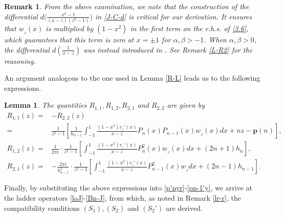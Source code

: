 \documentclass[12pt,a4paper]{article}    %
\newtheorem{lemma}[theorem]{Lemma}
\newtheorem{remark}{Remark}
\numberwithin{equation}{section}
\begin{document}
{\sloppy \begin{remark}
From the above examination, we note that the construction of  the differential $d\big(\frac{x^2-1}{(x-z)(z^2-1)}\big)$  in  \eqref{J-C-d} is critical for our derivation. It ensures that $w_{_{J}}(x)$ is multiplied by $(1-x^2)$ in the first term on the r.h.s. of \eqref{3.6}, which guarantees that this term is zero at $x=\pm1$ for $\alpha,\beta>-1$.
When $\alpha,\beta>0$, the differential $d\left(\frac{1}{x-z}\right)$ was instead introduced in \cite{WvA18}. See Remark \ref{L-R2} for the reasoning.
\end{remark}}

An argument analogous to the one used in Lemma \ref{R-L} leads us to the following expressions.

\begin{lemma}
		The quantities $R_{1,1}, R_{1,2}, R_{2,1}$ and  $R_{2,2}$ are given by
\begin{align*}			 R_{1,1}(z)=&-R_{2,2}(z)\\
=&\frac{1}{z^2-1}\left[ \frac{1}{h_{n-1}}\int_{-1}^{1}\frac{(1-x^2)v_{_J}'(x)}{x-z}P_n(x)P_{n-1}(x)w_{_J}(x)dx+nz-\mathbf{p}(n)\right],\\
R_{1,2}(z)=&\frac{1}{2\pi i}\cdot \frac{1}{z^2-1}\left[\int_{-1}^{1}\frac{(1-x^2)v_{_J}'(x)}{x-z}P_n^2(x)w_{_J}(x)dx+(2n+1)h_n\right],\\
R_{2,1}(z)=&-\frac{2 \pi i}{h_{n-1}^2}\cdot \frac{1}{z^2-1}\left[\int_{-1}^{1}\frac{(1-x^2)v_{_J}'(x)}{x-z}P_{n-1}^2(x)w_{_J}dx+(2n-1)h_{n-1}\right].
\end{align*}
\end{lemma}
Finally, by substituting the above expressions into \eqref{p'nyr}-\eqref{pn-1'y},
we arrive at the ladder operators \eqref{loJ}-\eqref{Bn-J}, from which, as noted in Remark \ref{lr-r}, the compatibility conditions $(S_1), (S_2)$ and $(S_2')$ are derived.
\end{document}
